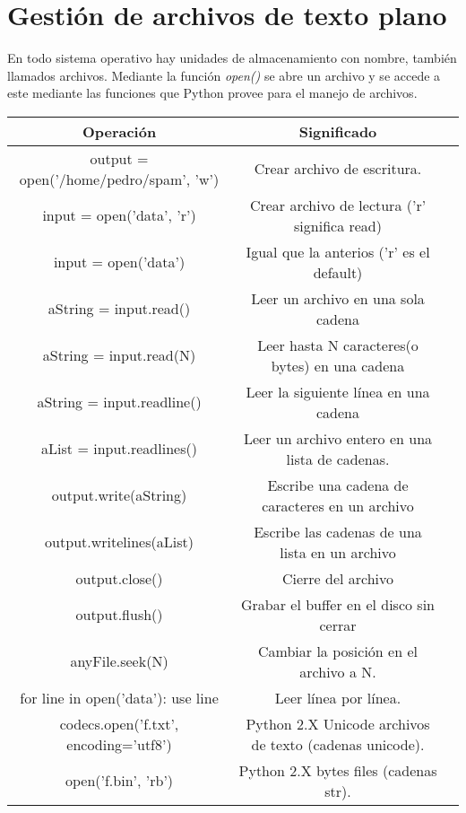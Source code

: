 \section{Gestión de archivos de texto plano}

En todo sistema operativo hay unidades de almacenamiento con nombre, también llamados archivos. Mediante la función \textit{open()} se abre un archivo y se accede a este mediante las funciones que Python provee para el manejo de archivos.\\

\begin{table}[h]
\begin{tabular}{|c|c|c|} \hline
\textbf{Operación}                           &     \textbf{Significado}  \\ \hline
output = open('/home/pedro/spam', 'w')       &    Crear archivo de escritura. \\ \hline
input = open('data', 'r')                    &    Crear archivo de lectura ('r' significa read)\\ \hline
input = open('data')                         &    Igual que la anterios ('r' es el default)\\ \hline
aString = input.read()                       &    Leer un archivo en una sola cadena\\ \hline
aString = input.read(N)                      &    Leer hasta N caracteres(o bytes) en una cadena\\ \hline
aString = input.readline()                   &    Leer la siguiente línea  en una cadena\\ \hline
aList = input.readlines()                    &    Leer un archivo entero en una lista de cadenas.\\ \hline
output.write(aString)                        &    Escribe una cadena de caracteres en un archivo\\ \hline
output.writelines(aList)                     &    Escribe las cadenas de una lista en un archivo\\ \hline
output.close()                               &    Cierre del archivo \\ \hline
output.flush()                               &    Grabar el buffer en el disco sin cerrar\\ \hline
anyFile.seek(N)                              &    Cambiar la posición en el archivo a N.\\ \hline
for line in open('data'): use line           &    Leer línea por línea.\\ \hline
codecs.open('f.txt', encoding='utf8')        &    Python 2.X Unicode archivos de texto (cadenas unicode).\\ \hline
open('f.bin', 'rb')                          &    Python 2.X bytes files (cadenas str).\\ \hline
\end{tabular}
\end{table}

